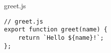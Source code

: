 \begin{listtitle}
greet.js
\end{listtitle}
\begin{lstlisting}
// greet.js
export function greet(name) {
    return `Hello ${name}!`;
};
\end{lstlisting}
\listend
